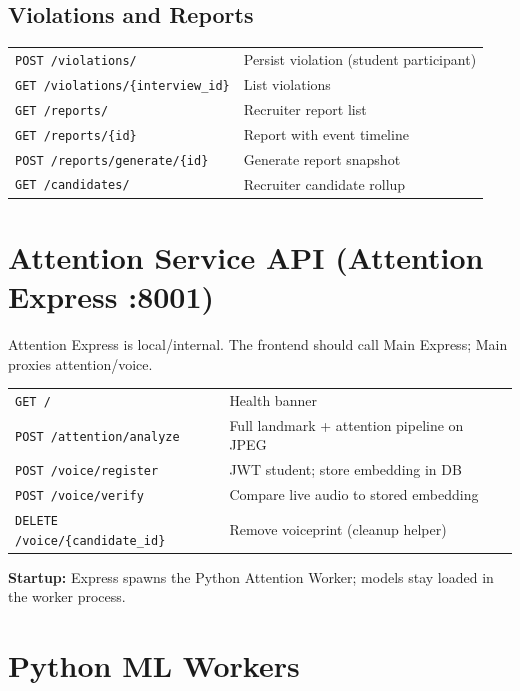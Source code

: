 \documentclass[11pt,a4paper]{report}
\begin{document}
\section{Violations and Reports}
\begin{tabularx}{\textwidth}{@{}lX@{}}
\toprule
\texttt{POST /violations/} & Persist violation (student participant) \\
\texttt{GET /violations/\{interview\_id\}} & List violations \\
\texttt{GET /reports/} & Recruiter report list \\
\texttt{GET /reports/\{id\}} & Report with event timeline \\
\texttt{POST /reports/generate/\{id\}} & Generate report snapshot \\
\texttt{GET /candidates/} & Recruiter candidate rollup \\
\bottomrule
\end{tabularx}

\chapter{Attention Service API (Attention Express :8001)}

Attention Express is local/internal. The frontend should call Main Express; Main proxies attention/voice.

\begin{tabularx}{\textwidth}{@{}lX@{}}
\toprule
\texttt{GET /} & Health banner \\
\texttt{POST /attention/analyze} & Full landmark + attention pipeline on JPEG \\
\texttt{POST /voice/register} & JWT student; store embedding in DB \\
\texttt{POST /voice/verify} & Compare live audio to stored embedding \\
\texttt{DELETE /voice/\{candidate\_id\}} & Remove voiceprint (cleanup helper) \\
\bottomrule
\end{tabularx}

\textbf{Startup:} Express spawns the Python Attention Worker; models stay loaded in the worker process.

\chapter{Python ML Workers}
\end{document}
